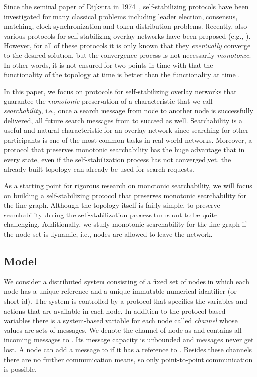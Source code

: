 \documentclass[a4paper,USenglish]{lipics}
\begin{document}
Since the seminal paper of Dijkstra in 1974~\cite{Dijkstra74}, self-stabilizing protocols have been investigated for many classical problems including leader election, consensus, matching, clock synchronization and token distribution problems.
Recently, also various protocols for self-stabilizing overlay networks have been proposed (e.g., \cite{corona,JRSST09,DolevT2013,JacobRSS2012,DolevK08, AspnesW07,KniesburgesKS12,rechord,DBLP:journals/tcs/BernsGP13}). 
However, for all of these protocols it is only known that they \emph{eventually} converge to the desired solution, but the convergence process is not necessarily \emph{monotonic}. 
In other words, it is not ensured for two points in time  with  that the functionality of the topology at time  is better than the functionality at time .

In this paper, we focus on protocols for self-stabilizing overlay networks that guarantee the \emph{monotonic} preservation of a characteristic that we call \emph{searchability}, i.e., once a search message from node  to another node  is successfully delivered, all future search messages from  to  succeed as well. 
Searchability is a useful and natural characteristic for an overlay network since searching for other participants is one of the most common tasks in real-world networks. 
Moreover, a protocol that preserves monotonic searchability has the huge advantage that in every state, even if the self-stabilization process has not converged yet, the already built topology can already be used for search requests.

As a starting point for rigorous research on monotonic searchability, we will focus on building a self-stabilizing protocol that preserves monotonic searchability for the line graph. 
Although the topology itself is fairly simple, to preserve searchability during the self-stabilization process turns out to be quite challenging. 
Additionally, we study monotonic searchability for the line graph if the node set is dynamic, i.e., nodes are allowed to leave the network.


\subsection{Model}
We consider a distributed system consisting of a fixed set of nodes in which each node has a unique reference and a unique immutable numerical identifier (or short id).
The system is controlled by a protocol that specifies the variables and actions that are available in each node. 
In addition to the protocol-based variables there is a system-based variable for each node called \emph{channel} whose values are sets of messages. 
We denote the channel of node  as  and  contains all incoming messages to . 
Its message capacity is unbounded and messages never get lost.
A node can add a message to  if it has a reference to .
Besides these channels there are no further communication means, so only point-to-point communication is possible.
\end{document}

